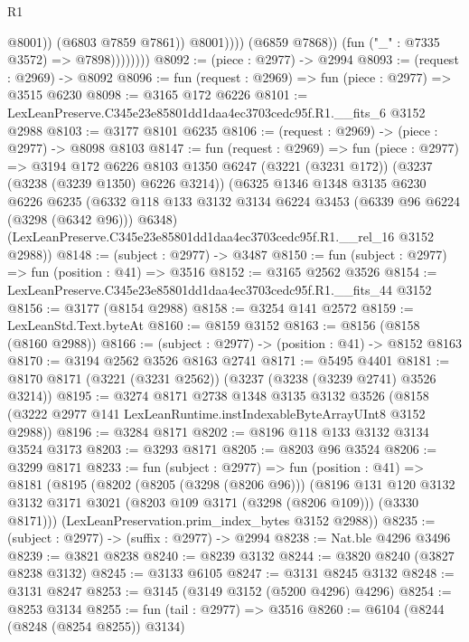 \begin{lexlean}{R1}
\begin{coremodule}
                                  @8001))
                              (@6803 @7859 @7861))
                            @8001))))
                    (@6859 @7868))
                  (fun ("_" : @7335 @3572) => @7898))))))))
@8092 := (piece : @2977) -> @2994
@8093 := (request : @2969) -> @8092
@8096 := fun (request : @2969) => fun (piece : @2977) => @3515 @6230
@8098 := @3165 @172 @6226
@8101 := LexLeanPreserve.C345e23e85801dd1daa4ec3703cedc95f.R1.__fits_6 @3152 @2988
@8103 := @3177 @8101 @6235
@8106 := (request : @2969) -> (piece : @2977) -> @8098 @8103
@8147 := fun (request : @2969) =>
  fun (piece : @2977) =>
  @3194
    @172
    @6226
    @8103
    @1350
    @6247
    (@3221 (@3231 @172))
    (@3237 (@3238 (@3239 @1350) @6226 @3214))
    (@6325
      @1346
      @1348
      @3135
      @6230
      @6226
      @6235
      (@6332 @118 @133 @3132 @3134 @6224 @3453 (@6339 @96 @6224 (@3298 (@6342 @96))) @6348)
      (LexLeanPreserve.C345e23e85801dd1daa4ec3703cedc95f.R1.__rel_16 @3152 @2988))
@8148 := (subject : @2977) -> @3487
@8150 := fun (subject : @2977) => fun (position : @41) => @3516
@8152 := @3165 @2562 @3526
@8154 := LexLeanPreserve.C345e23e85801dd1daa4ec3703cedc95f.R1.__fits_44 @3152
@8156 := @3177 (@8154 @2988)
@8158 := @3254 @141 @2572
@8159 := LexLeanStd.Text.byteAt
@8160 := @8159 @3152
@8163 := @8156 (@8158 (@8160 @2988))
@8166 := (subject : @2977) -> (position : @41) -> @8152 @8163
@8170 := @3194 @2562 @3526 @8163 @2741
@8171 := @5495 @4401
@8181 := @8170 @8171 (@3221 (@3231 @2562)) (@3237 (@3238 (@3239 @2741) @3526 @3214))
@8195 := @3274
    @8171
    @2738
    @1348
    @3135
    @3132
    @3526
    (@8158 (@3222 @2977 @141 LexLeanRuntime.instIndexableByteArrayUInt8 @3152 @2988))
@8196 := @3284 @8171
@8202 := @8196 @118 @133 @3132 @3134 @3524 @3173
@8203 := @3293 @8171
@8205 := @8203 @96 @3524
@8206 := @3299 @8171
@8233 := fun (subject : @2977) =>
  fun (position : @41) =>
  @8181
    (@8195
      (@8202
        (@8205 (@3298 (@8206 @96)))
        (@8196
          @131
          @120
          @3132
          @3132
          @3171
          @3021
          (@8203 @109 @3171 (@3298 (@8206 @109)))
          (@3330 @8171)))
      (LexLeanPreservation.prim_index_bytes @3152 @2988))
@8235 := (subject : @2977) -> (suffix : @2977) -> @2994
@8238 := Nat.ble @4296 @3496
@8239 := @3821 @8238
@8240 := @8239 @3132
@8244 := @3820 @8240 (@3827 @8238 @3132)
@8245 := @3133 @6105
@8247 := @3131 @8245 @3132
@8248 := @3131 @8247
@8253 := @3145 (@3149 @3152 (@5200 @4296) @4296)
@8254 := @8253 @3134
@8255 := fun (tail : @2977) => @3516
@8260 := @6104 (@8244 (@8248 (@8254 @8255)) @3134)

\end{coremodule}
\end{lexlean}
